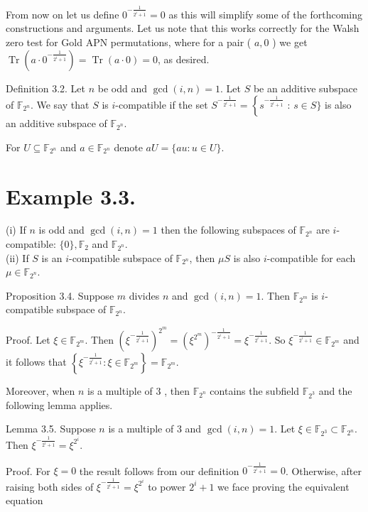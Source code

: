 \documentclass[10pt]{article}
\begin{document}
From now on let us define $0^{-\frac{1}{2^{i}+1}}=0$ as this will simplify some of the forthcoming constructions and arguments. Let us note that this works correctly for the Walsh zero test for Gold APN permutations, where for a pair ( $a, 0$ ) we get $\operatorname{Tr}\left(a \cdot 0^{-\frac{1}{2^{i}+1}}\right)=\operatorname{Tr}(a \cdot 0)=0$, as desired.

Definition 3.2. Let $n$ be odd and $\operatorname{gcd}(i, n)=1$. Let $S$ be an additive subspace of $\mathbb{F}_{2^{n}}$. We say that $S$ is $i$-compatible if the set $S^{-\frac{1}{2^{i}+1}}=\left\{s^{-\frac{1}{2^{i}+1}}\right.$ : $s \in S\}$ is also an additive subspace of $\mathbb{F}_{2^{n}}$.

For $U \subseteq \mathbb{F}_{2^{n}}$ and $a \in \mathbb{F}_{2^{n}}$ denote $a U=\{a u: u \in U\}$.

\section*{Example 3.3.}
(i) If $n$ is odd and $\operatorname{gcd}(i, n)=1$ then the following subspaces of $\mathbb{F}_{2^{n}}$ are $i$-compatible: $\{0\}, \mathbb{F}_{2}$ and $\mathbb{F}_{2^{n}}$.\\
(ii) If $S$ is an $i$-compatible subspace of $\mathbb{F}_{2^{n}}$, then $\mu S$ is also $i$-compatible for each $\mu \in \mathbb{F}_{2^{n}}$.

Proposition 3.4. Suppose $m$ divides $n$ and $\operatorname{gcd}(i, n)=1$. Then $\mathbb{F}_{2^{m}}$ is $i$-compatible subspace of $\mathbb{F}_{2^{n}}$.

Proof. Let $\xi \in \mathbb{F}_{2^{m}}$. Then $\left(\xi^{-\frac{1}{2^{i}+1}}\right)^{2^{m}}=\left(\xi^{2^{m}}\right)^{-\frac{1}{2^{i}+1}}=\xi^{-\frac{1}{2^{i}+1}}$. So $\xi^{-\frac{1}{2^{i}+1}} \in \mathbb{F}_{2^{m}}$ and it follows that $\left\{\xi^{-\frac{1}{2^{i}+1}}: \xi \in \mathbb{F}_{2^{m}}\right\}=\mathbb{F}_{2^{m}}$.

Moreover, when $n$ is a multiple of 3 , then $\mathbb{F}_{2^{n}}$ contains the subfield $\mathbb{F}_{2^{3}}$ and the following lemma applies.

Lemma 3.5. Suppose $n$ is a multiple of 3 and $\operatorname{gcd}(i, n)=1$. Let $\xi \in \mathbb{F}_{2^{3}} \subset \mathbb{F}_{2^{n}}$. Then $\xi^{-\frac{1}{2^{i}+1}}=\xi^{2^{i}}$.

Proof. For $\xi=0$ the result follows from our definition $0^{-\frac{1}{2^{i}+1}}=0$. Otherwise, after raising both sides of $\xi^{-\frac{1}{2^{i}+1}}=\xi^{2^{i}}$ to power $2^{i}+1$ we face proving the equivalent equation
\end{document}

